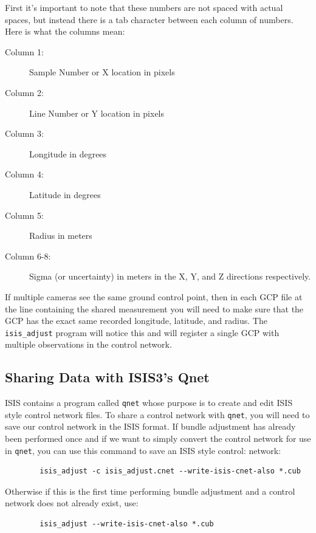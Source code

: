 First it's important to note that these numbers are not spaced with
actual spaces, but instead there is a tab character between each
column of numbers. Here is what the columns mean:

\begin{myindentpar}{2cm}
\begin{description}
  \item[Column 1:] Sample Number or X location in pixels
  \item[Column 2:] Line Number or Y location in pixels
  \item[Column 3:] Longitude in degrees 
  \item[Column 4:] Latitude in degrees
  \item[Column 5:] Radius in meters
  \item[Column 6-8:] Sigma (or uncertainty) in meters in the X, Y,
    and Z directions respectively.
\end{description}
\end{myindentpar}

If multiple cameras see the same ground control point, then in each
GCP file at the line containing the shared measurement you will
need to make sure that the GCP has the exact same recorded longitude,
latitude, and radius. The \texttt{isis\_adjust} program will notice
this and will register a single GCP with multiple observations in
the control network.

\subsection{Sharing Data with ISIS3's Qnet}

ISIS contains a program called \texttt{qnet} whose purpose is to
create and edit ISIS style control network files. To share a control
network with \texttt{qnet}, you will need to save our control network
in the ISIS format. If bundle adjustment has already been performed
once and if we want to simply convert the control network for use in
\texttt{qnet}, you can use this command to save an ISIS style control:
network:

\begin{verbatim}
        isis_adjust -c isis_adjust.cnet --write-isis-cnet-also *.cub
\end{verbatim}

Otherwise if this is the first time performing bundle adjustment and a
control network does not already exist, use:

\begin{verbatim}
        isis_adjust --write-isis-cnet-also *.cub
\end{verbatim}

